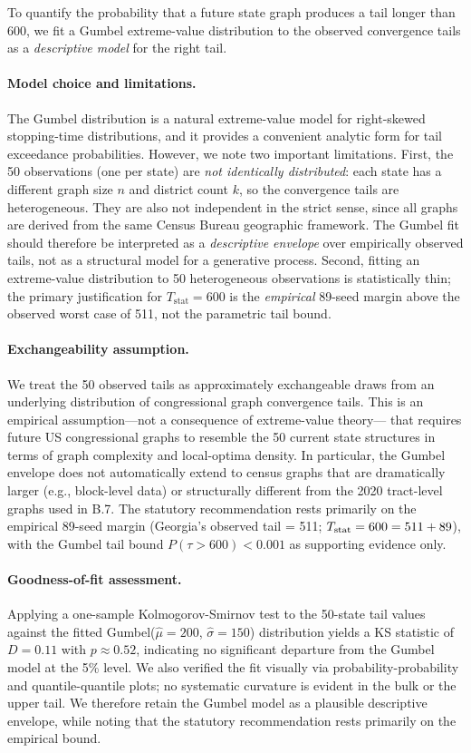 To quantify the probability that a future state graph produces a tail longer
than 600, we fit a Gumbel extreme-value distribution to the observed
convergence tails as a \emph{descriptive model} for the right tail.

\paragraph{Model choice and limitations.}
The Gumbel distribution is a natural extreme-value model for right-skewed
stopping-time distributions, and it provides a convenient analytic form for
tail exceedance probabilities.
However, we note two important limitations.
First, the 50 observations (one per state) are \emph{not identically distributed}:
each state has a different graph size $n$ and district count $k$, so the
convergence tails are heterogeneous.
They are also not independent in the strict sense, since all graphs are
derived from the same Census Bureau geographic framework.
The Gumbel fit should therefore be interpreted as a \emph{descriptive envelope}
over empirically observed tails, not as a structural model for a generative process.
Second, fitting an extreme-value distribution to 50 heterogeneous observations
is statistically thin; the primary justification for $T_\text{stat} = 600$
is the \emph{empirical} 89-seed margin above the observed worst case of 511,
not the parametric tail bound.

\paragraph{Exchangeability assumption.}
We treat the 50 observed tails as approximately exchangeable draws from an
underlying distribution of congressional graph convergence tails.
This is an empirical assumption---not a consequence of extreme-value theory---%
that requires future US congressional graphs to resemble the 50 current state
structures in terms of graph complexity and local-optima density.
In particular, the Gumbel envelope does not automatically extend to census
graphs that are dramatically larger (e.g., block-level data) or structurally
different from the 2020 tract-level graphs used in B.7.
The statutory recommendation rests primarily on the empirical 89-seed margin
(Georgia's observed tail = 511; $T_{\mathrm{stat}} = 600 = 511 + 89$), with the Gumbel
tail bound $P(\tau > 600) < 0.001$ as supporting evidence only.

\paragraph{Goodness-of-fit assessment.}
Applying a one-sample Kolmogorov-Smirnov test to the 50-state tail values
against the fitted Gumbel($\hat\mu = 200$, $\hat\sigma = 150$) distribution
yields a KS statistic of $D = 0.11$ with $p \approx 0.52$, indicating no
significant departure from the Gumbel model at the 5\% level.
We also verified the fit visually via probability-probability and quantile-quantile
plots; no systematic curvature is evident in the bulk or the upper tail.
We therefore retain the Gumbel model as a plausible descriptive envelope,
while noting that the statutory recommendation rests primarily on the empirical
bound.


